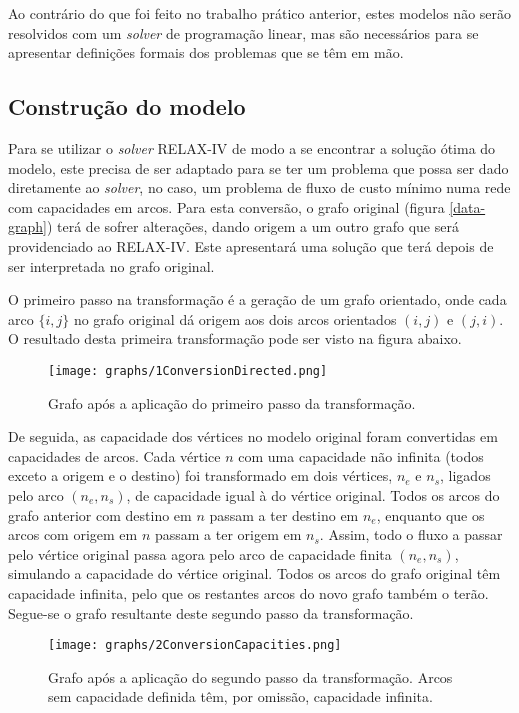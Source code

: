 \documentclass[12pt, a4paper, titlepage]{article}
\begin{document}
Ao contrário do que foi feito no trabalho prático anterior, estes modelos não serão resolvidos com
um \emph{solver} de programação linear, mas são necessários para se apresentar definições formais
dos problemas que se têm em mão.

\subsection{Construção do modelo}

Para se utilizar o \emph{solver} RELAX-IV \cite{relax} de modo a se encontrar a solução ótima do
modelo, este precisa de ser adaptado para se ter um problema que possa ser dado diretamente ao
\emph{solver}, no caso, um problema de fluxo de custo mínimo numa rede com capacidades em arcos.
Para esta conversão, o grafo original (figura \ref{data-graph}) terá de sofrer alterações, dando
origem a um outro grafo que será providenciado ao RELAX-IV. Este apresentará uma solução que terá
depois de ser interpretada no grafo original.

O primeiro passo na transformação é a geração de um grafo orientado, onde cada arco $\{i, j\}$ no
grafo original dá origem aos dois arcos orientados $(i, j)$ e $(j, i)$. O resultado desta primeira
transformação pode ser visto na figura abaixo.

\begin{figure}[H]
    \centering
    \texttt{[image: graphs/1ConversionDirected.png]}
    \caption{Grafo após a aplicação do primeiro passo da transformação.}
    \label{1conversion-graph}
\end{figure}

De seguida, as capacidade dos vértices no modelo original foram convertidas em capacidades de arcos.
Cada vértice $n$ com uma capacidade não infinita (todos exceto a origem e o destino) foi
transformado em dois vértices, $n_e$ e $n_s$, ligados pelo arco $(n_e, n_s)$, de capacidade igual à
do vértice original. Todos os arcos do grafo anterior com destino em $n$ passam a ter destino em
$n_e$, enquanto que os arcos com origem em $n$ passam a ter origem em $n_s$. Assim, todo o fluxo a
passar pelo vértice original passa agora pelo arco de capacidade finita $(n_e, n_s)$, simulando a
capacidade do vértice original. Todos os arcos do grafo original têm capacidade infinita, pelo que
os restantes arcos do novo grafo também o terão. Segue-se o grafo resultante deste segundo passo da
transformação.

\begin{figure}[H]
    \centering
    \texttt{[image: graphs/2ConversionCapacities.png]}
    \caption{Grafo após a aplicação do segundo passo da transformação. Arcos sem capacidade
        definida têm, por omissão, capacidade infinita.}
    \label{2conversion-graph}
\end{figure}
\end{document}
